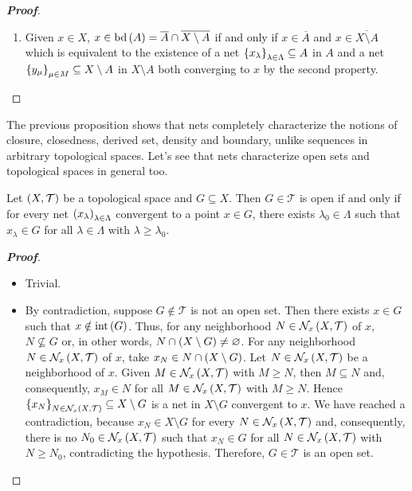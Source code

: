 \begin{proposition}
\begin{proof}[\rm\textbf{Proof}]
\begin{enumerate}
\begin{itemize}
      \end{itemize}
      \item Given $x\in X$, $x\in\operatorname{bd}\left(A\right)=\overline{A}\cap\overline{X\setminus A}$ if and only if $x\in\overline{A}$ and $x\in\overline{X\setminus A}$ which is equivalent to the existence of a net $\left\{x_\lambda\right\}_{\lambda\in\Lambda}\subseteq A$ in $A$ and a net $\left\{y_\mu\right\}_{\mu\in M}\subseteq X\setminus A$ in $X\setminus A$ both converging to $x$ by the second property.
    \end{enumerate}
  \end{proof}
\end{proposition}

The previous proposition shows that nets completely characterize the notions of closure, closedness, derived set, density and boundary, unlike sequences in arbitrary topological spaces. Let's see that nets characterize open sets and topological spaces in general too.

\begin{proposition}
  Let $\left(X,\mathcal{T}\right)$ be a topological space and $G\subseteq X$. Then $G\in\mathcal{T}$ is open if and only if for every net $\left(x_{\lambda}\right)_{\lambda\in\Lambda}$ convergent to a point $x\in G$, there exists $\lambda_0\in\Lambda$ such that $x_\lambda\in G$ for all $\lambda\in\Lambda$ with $\lambda\geq\lambda_0$.
  \begin{proof}[\rm\textbf{Proof}]
    \hfill
    \begin{itemize}
      \item[\boxed{\Rightarrow}] Trivial.
      \item[\boxed{\Leftarrow}] By contradiction, suppose $G\notin\mathcal{T}$ is not an open set. Then there exists $x\in G$ such that $x\notin\operatorname{int}\left(G\right)$. Thus, for any neighborhood $N\in\mathcal{N}_x\left(X,\mathcal{T}\right)$ of $x$, $N\nsubseteq G$ or, in other words, $N\cap\left(X\setminus G\right)\neq\varnothing$. For any neighborhood $N\in\mathcal{N}_x\left(X,\mathcal{T}\right)$ of $x$, take $x_N\in N\cap\left(X\setminus G\right)$. Let $N\in\mathcal{N}_x\left(X,\mathcal{T}\right)$ be a neighborhood of $x$. Given $M\in\mathcal{N}_x\left(X,\mathcal{T}\right)$ with $M\geq N$, then $M\subseteq N$ and, consequently, $x_M\in N$ for all $M\in\mathcal{N}_x\left(X,\mathcal{T}\right)$ with $M\geq N$. Hence $\left\{x_N\right\}_{N\in\mathcal{N}_x\left(X,\mathcal{T}\right)}\subseteq X\setminus G$ is a net in $X\setminus G$ convergent to $x$. We have reached a contradiction, because $x_N\in X\setminus G$ for every $N\in\mathcal{N}_x\left(X,\mathcal{T}\right)$ and, consequently, there is no $N_0\in\mathcal{N}_x\left(X,\mathcal{T}\right)$ such that $x_N\in G$ for all $N\in\mathcal{N}_x\left(X,\mathcal{T}\right)$ with $N\geq N_0$, contradicting the hypothesis. Therefore, $G\in\mathcal{T}$ is an open set.
    \end{itemize}
  \end{proof}
\end{proposition}

